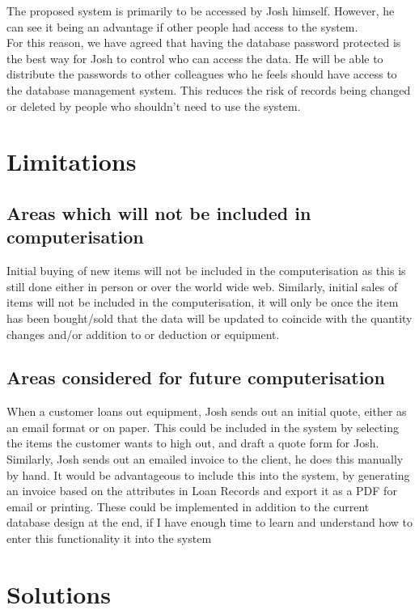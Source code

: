 The proposed system is primarily to be accessed by Josh himself. However, he can see it being an advantage if other people had access to the system.\\

\noindent For this reason, we have agreed that having the database password protected is the best way for Josh to control who can access the data. He will be able to distribute the passwords to other colleagues who he feels should have access to the database management system. This reduces the risk of records being changed or deleted by people who shouldn't need to use the system.

\section{Limitations}

\subsection{Areas which will not be included in computerisation}

Initial buying of new items will not be included in the computerisation as this is still done either in person or over the world wide web. Similarly, initial sales of items will not be included in the computerisation, it will only be once the item has been bought/sold that the data will be updated to coincide with the quantity changes and/or addition to or deduction or equipment.

\subsection{Areas considered for future computerisation}

When a customer loans out equipment, Josh sends out an initial quote, either as an email format or on paper. This could be included in the system by selecting the items the customer wants to high out, and draft a quote form for Josh. Similarly, Josh sends out an emailed invoice to the client, he does this manually by hand. It would be advantageous to include this into the system, by generating an invoice based on the attributes in Loan Records and export it as a PDF for email or printing. These could be implemented in addition to the current database design at the end, if I have enough time to learn and understand how to enter this functionality it into the system

\section{Solutions}

